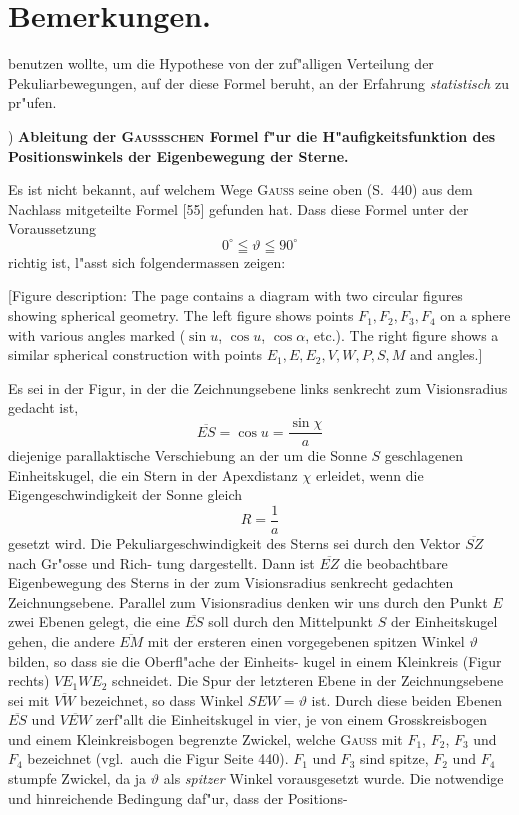 \documentclass[12pt,a4paper]{article}
\theoremstyle{plain}
\theoremstyle{definition}
\theoremstyle{remark}
\begin{document}
\newpage
\section*{Bemerkungen.}

benutzen wollte, um die Hypothese von der zuf"alligen Verteilung der Pekuliarbewegungen, auf der diese
Formel beruht, an der Erfahrung \textit{statistisch} zu pr"ufen.

\smallskip{}) \textbf{Ableitung der \textsc{Gaussschen} Formel f"ur die H"aufigkeitsfunktion des Positionswinkels der Eigenbewegung der Sterne.}

Es ist nicht bekannt, auf welchem Wege \textsc{Gauss} seine oben (S.~440) aus dem Nachlass mitgeteilte
Formel [55] gefunden hat. Dass diese Formel unter der Voraussetzung
\begin{equation}\tag{43}
0^\circ \leqq \vartheta \leqq 90^\circ
\end{equation}
richtig ist, l"asst sich folgendermassen zeigen:

[Figure description: The page contains a diagram with two circular figures showing spherical geometry. The left figure shows points $F_1, F_2, F_3, F_4$ on a sphere with various angles marked ($\sin u$, $\cos u$, $\cos \alpha$, etc.). The right figure shows a similar spherical construction with points $E_1, E, E_2, V, W, P, S, M$ and angles.]

\smallskip

Es sei in der Figur, in der die Zeichnungsebene links senkrecht zum Visionsradius gedacht ist,
\begin{equation}\tag{44}
\overline{ES} = \cos u = \frac{\sin \chi}{a}
\end{equation}
diejenige parallaktische Verschiebung an der um die Sonne $S$ geschlagenen Einheitskugel, die ein Stern in
der Apexdistanz $\chi$ erleidet, wenn die Eigengeschwindigkeit der Sonne gleich
\begin{equation}\tag{45}
R = \frac{1}{a}
\end{equation}
gesetzt wird. Die Pekuliargeschwindigkeit des Sterns sei durch den Vektor $\overline{SZ}$ nach Gr"osse und Rich-
tung dargestellt. Dann ist $\overline{EZ}$ die beobachtbare Eigenbewegung des Sterns in der zum Visionsradius
senkrecht gedachten Zeichnungsebene. Parallel zum Visionsradius denken wir uns durch den Punkt $E$
zwei Ebenen gelegt, die eine $\overline{ES}$ soll durch den Mittelpunkt $S$ der Einheitskugel gehen, die andere $\overline{EM}$
mit der ersteren einen vorgegebenen spitzen Winkel $\vartheta$ bilden, so dass sie die Oberfl"ache der Einheits-
kugel in einem Kleinkreis (Figur rechts) $VE_1WE_2$ schneidet. Die Spur der letzteren Ebene in der
Zeichnungsebene sei mit $\overline{VW}$ bezeichnet, so dass Winkel $SEW = \vartheta$ ist. Durch diese beiden
Ebenen $\overline{ES}$ und $\overline{VEW}$ zerf"allt die Einheitskugel in vier, je von einem Grosskreisbogen und einem
Kleinkreisbogen begrenzte Zwickel, welche \textsc{Gauss} mit $F_1$, $F_2$, $F_3$ und $F_4$ bezeichnet (vgl.\ auch die
Figur Seite 440). $F_1$ und $F_3$ sind spitze, $F_2$ und $F_4$ stumpfe Zwickel, da ja $\vartheta$ als \textit{spitzer}
Winkel vorausgesetzt wurde. Die notwendige und hinreichende Bedingung daf"ur, dass der Positions-
\end{document}
